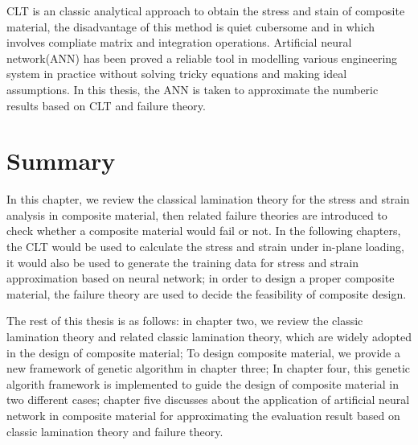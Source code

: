 CLT is an classic analytical approach to obtain the stress and stain of
composite material, the disadvantage of this method is quiet cubersome and in
which involves compliate matrix and integration operations. Artificial neural
network(ANN) has been proved a reliable tool in modelling various engineering
system in practice without solving tricky equations and making ideal
assumptions. In this thesis, the ANN is taken to approximate the numberic
results based on CLT and failure theory.

\section{Summary}

In this chapter, we review the classical lamination theory for the stress and
strain analysis in composite material, then related failure theories are
introduced to check whether a composite material would fail or not. In the
following chapters, the CLT would be used to calculate the stress and strain
under in-plane loading, it would also be used to generate the training data for
stress and strain approximation based on neural network; in order to design a
proper composite material, the failure theory are used to decide the feasibility
of composite design.

The rest of this thesis is as follows: in chapter two, we review the classic
lamination theory and related classic lamination theory, which are widely
adopted in the design of composite material; To design composite material, we
provide a new framework of genetic algorithm in chapter three; In chapter four,
this genetic algorith framework is implemented to guide the design of composite
material in two different cases; chapter five discusses about the application of
artificial neural network in composite material for approximating the evaluation
result based on classic lamination theory and failure theory.


